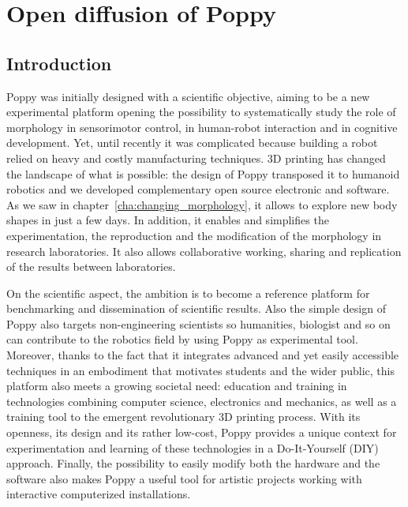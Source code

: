 
% 

\chapter{Open diffusion of Poppy} %
\label{cha:diffusion}

\section{Introduction} %

Poppy was initially designed with a scientific objective, aiming to be a new experimental platform opening the possibility to systematically study the role of morphology in sensorimotor control, in human-robot interaction and in cognitive development. Yet, until recently it was complicated because building a robot relied on heavy and costly manufacturing techniques. 3D printing has changed the landscape of what is possible: the design of Poppy transposed it to humanoid robotics and we developed complementary open source electronic and software. As we saw in chapter~\ref{cha:changing_morphology}, it allows to explore new body shapes in just a few days.
In addition, it enables and simplifies the experimentation, the reproduction and the modification of the morphology in research laboratories. It also allows collaborative working, sharing and replication of the results between laboratories.

On the scientific aspect, the ambition is to become a reference platform for benchmarking and dissemination of scientific results. Also the simple design of Poppy also targets non-engineering scientists so humanities, biologist and so on can contribute to the robotics field by using Poppy as experimental tool.
Moreover, thanks to the fact that it integrates advanced and yet easily accessible techniques in an embodiment that motivates students and the wider public, this platform also meets a growing societal need: education and training in technologies combining computer science, electronics and mechanics, as well as a training tool to the emergent revolutionary 3D printing process. With its openness, its design and its rather low-cost, Poppy provides a unique context for experimentation and learning of these technologies in a Do-It-Yourself (DIY) approach.
Finally, the possibility to easily modify both the hardware and the software also makes Poppy a useful tool for artistic projects working with interactive computerized installations.

